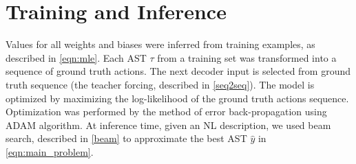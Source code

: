 \section{Training and Inference}

Values for all weights and biases were inferred from training examples, as described in \cref{eqn:mle}. Each AST $\tau$ from a training set was transformed into a sequence of ground truth actions. The next decoder input is selected from ground truth sequence (the teacher forcing, described in  \cref{seq2seq}). The model is optimized by maximizing the log-likelihood of the ground truth actions sequence. Optimization was performed by the method of error back-propagation using ADAM \parencite{Kingma2014} algorithm. At inference time, given an NL description, we used beam search, described in \cref{beam} to approximate the best AST $\hat{y}$ in \cref{eqn:main_problem}.



